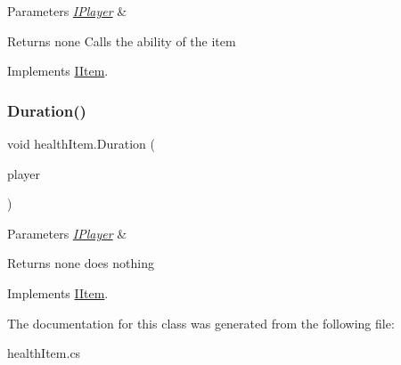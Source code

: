 \begin{DoxyParams}{Parameters}
{\em \mbox{\hyperlink{class_i_player}{I\+Player}}} & \\
\hline
\end{DoxyParams}
\begin{DoxyReturn}{Returns}
none Calls the ability of the item 
\end{DoxyReturn}


Implements \mbox{\hyperlink{interface_i_item_afe73efbf8316273df20162d6f4b20648}{I\+Item}}.

\mbox{\label{classhealth_item_a545574879140f4c98b388f1dc7d2a7f8}} 
\subsubsection{\texorpdfstring{Duration()}{Duration()}}
{\footnotesize\ttfamily void health\+Item.\+Duration (\begin{DoxyParamCaption}\item[{\mbox{\hyperlink{class_i_player}{I\+Player}}}]{player }\end{DoxyParamCaption})\hspace{0.3cm}{\ttfamily [inline]}}


\begin{DoxyParams}{Parameters}
{\em \mbox{\hyperlink{class_i_player}{I\+Player}}} & \\
\hline
\end{DoxyParams}
\begin{DoxyReturn}{Returns}
none does nothing 
\end{DoxyReturn}


Implements \mbox{\hyperlink{interface_i_item_a797c1d62a7828bf428cc486ceaf18e9c}{I\+Item}}.



The documentation for this class was generated from the following file\+:\begin{DoxyCompactItemize}
\item 
health\+Item.\+cs\end{DoxyCompactItemize}
